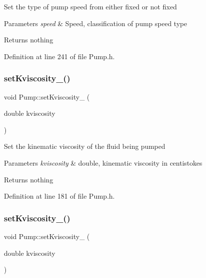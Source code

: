 Set the type of pump speed from either fixed or not fixed


\begin{DoxyParams}{Parameters}
{\em speed} & Speed, classification of pump speed type\\
\hline
\end{DoxyParams}
\begin{DoxyReturn}{Returns}
nothing 
\end{DoxyReturn}


Definition at line 241 of file Pump.\+h.

\mbox{\label{class_pump_a26d1d10908f91137f5148540ceb6520a}} 
\subsubsection{\texorpdfstring{set\+Kviscosity\+\_\+()}{setKviscosity\_()}\hspace{0.1cm}{\footnotesize\ttfamily [1/3]}}
{\footnotesize\ttfamily void Pump\+::set\+Kviscosity\+\_\+ (\begin{DoxyParamCaption}\item[{double}]{kviscosity }\end{DoxyParamCaption})\hspace{0.3cm}{\ttfamily [inline]}}

Set the kinematic viscosity of the fluid being pumped


\begin{DoxyParams}{Parameters}
{\em kviscosity} & double, kinematic viscosity in centistokes\\
\hline
\end{DoxyParams}
\begin{DoxyReturn}{Returns}
nothing 
\end{DoxyReturn}


Definition at line 181 of file Pump.\+h.

\mbox{\label{class_pump_a26d1d10908f91137f5148540ceb6520a}} 
\subsubsection{\texorpdfstring{set\+Kviscosity\+\_\+()}{setKviscosity\_()}\hspace{0.1cm}{\footnotesize\ttfamily [2/3]}}
{\footnotesize\ttfamily void Pump\+::set\+Kviscosity\+\_\+ (\begin{DoxyParamCaption}\item[{double}]{kviscosity }\end{DoxyParamCaption})\hspace{0.3cm}{\ttfamily [inline]}}

